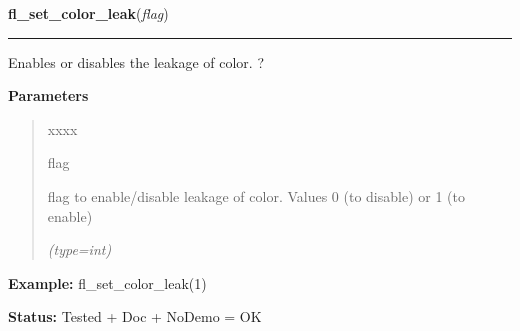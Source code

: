 \hspace{.8\funcindent}\begin{boxedminipage}{\funcwidth}

    \raggedright \textbf{fl\_set\_color\_leak}(\textit{flag})

    \vspace{-1.5ex}

    \rule{\textwidth}{0.5\fboxrule}
\setlength{\parskip}{2ex}
    Enables or disables the leakage of color. ?

\setlength{\parskip}{1ex}
      \textbf{Parameters}
      \vspace{-1ex}

      \begin{quote}
        \begin{Ventry}{xxxx}

          \item[flag]

          flag to enable/disable leakage of color. Values 0 (to disable) or
          1 (to enable)

            {\it (type=int)}

        \end{Ventry}

      \end{quote}

\textbf{Example:} fl\_set\_color\_leak(1)



\textbf{Status:} Tested + Doc + NoDemo = OK



    \end{boxedminipage}

    \label{xformslib:flbasic:fl_getmcolor}

    \vspace{0.5ex}

